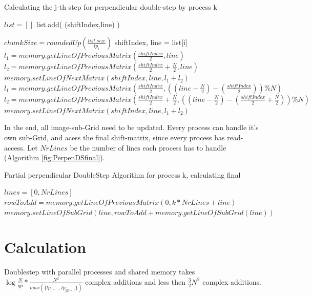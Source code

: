 \documentclass[12pt]{article}
\begin{document}
\begin{algorithm}
\caption{Calculating the j-th step for perpendicular double-step by process k}\label{euclid}
\label{fig:PerpenDS}
\begin{algorithmic}[1]
\State $list = []$
          list.add( (shiftIndex,line) )
     \EndFor
\EndFor

\State $chunkSize = roundedUp( \frac{list.size}{lp_i} )$
     \State shiftIndex, line = list[i]
          \State $l_1 = memory.getLineOfPreviousMatrix( \frac{shiftIndex}{2}, line )$
          \State $l_2 = memory.getLineOfPreviousMatrix( \frac{shiftIndex}{2}+\frac{N}{2},line )$
          \State $memory.setLineOfNextMatrix(shiftIndex, line, l_1+l_2)$
      \Else
          \State $l_1 = memory.getLineOfPreviousMatrix( \frac{shiftIndex}{2}, ((line-\frac{N}{2})-(\frac{shiftIndex}{2}))\%N )$
          \State $l_2 = memory.getLineOfPreviousMatrix( \frac{shiftIndex}{2}+\frac{N}{2},((line-\frac{N}{2})-(\frac{shiftIndex}{2}+\frac{N}{2}))\%N)$
          \State $memory.setLineOfNextMatrix(shiftIndex, line, l_1+l_2)$      
      \EndIf
\EndFor
\end{algorithmic}
\end{algorithm}


In the end, all image-sub-Grid need to be updated. Every process can handle it's own sub-Grid, and acess the final shift-matrix, since every process has read-access. Let $NrLines$ be the number of lines each process has to handle (Algorithm \ref{fig:PerpenDSfinal}). 

\begin{algorithm}
\caption{Partial perpendicular DoubleStep Algorithm for process k, calculating final}\label{euclid}
\label{fig:PerpenDSfinal}
\begin{algorithmic}[1]
\State $lines = [0 ,NrLines]$
      \State $rowToAdd = memory.getLineOfPreviousMatrix(0, k*NrLines+line)$
      \State $memory.setLineOfSubGrid(line, rowToAdd + memory.getLineOfSubGrid(line) )$
\EndFor
\end{algorithmic}
\end{algorithm}

\section{ Calculation }

Doublestep with parallel processes and shared memory takes $\log{\frac{N}{gp}}*\frac{N^2}{max(\{lp_0,...,lp_{gp-1}\})}$ complex additions and less then $\frac{3}{2}N^2$ complex additions.
\end{document}
